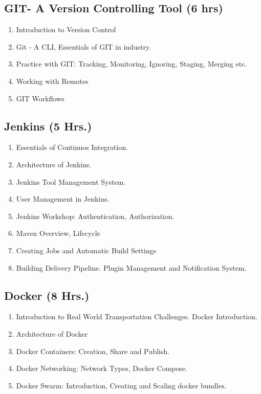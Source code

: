 \subsection{GIT- A Version Controlling Tool \hfill (6 hrs)} 
\begin{enumerate}
    \item Introduction to Version Control
    \item Git - A CLI, Essentials of GIT in industry.
    \item Practice with GIT: Tracking, Monitoring, Ignoring, Staging, Merging etc.
    \item Working with Remotes
    \item GIT Workflows
    
\end{enumerate}


\subsection{Jenkins \hfill (5 Hrs.)}
\begin{enumerate}
    \item Essentials of Continuos Integration.
    \item Architecture of Jenkins.
    \item Jenkins Tool Management System.
    \item User Management in Jenkins.
    \item Jenkins Workshop: Authentication, Authorization.
    \item Maven Overview, Lifecycle
    \item Creating Jobs and Automatic Build Settings
    \item Building Delivery Pipeline. Plugin Management and Notification System.
\end{enumerate}

\subsection{Docker \hfill (8 Hrs.)}

\begin{enumerate}
    \item Introduction to Real World Transportation Challenges. Docker Introduction.
    \item Architecture of Docker
    \item Docker Containers: Creation, Share and Publish.
    \item Docker Networking: Network Types, Docker Compose.
    \item Docker Swarm: Introduction, Creating and Scaling docker bundles.
\end{enumerate}

